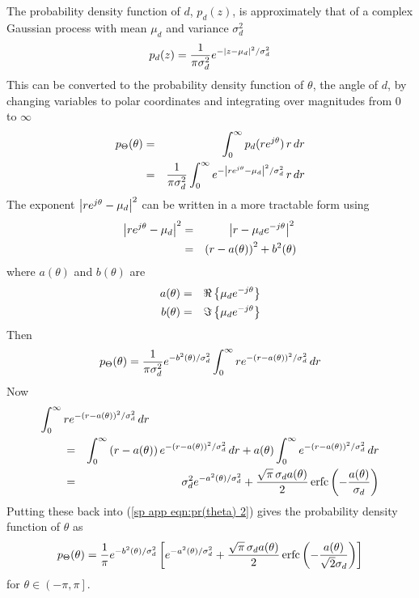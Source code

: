 The probability density function of $d$, $p_d(z)$, is approximately that of a
complex Gaussian process with mean $\mu_d$ and variance $\sigma_d^2$
\begin{equation}
p_d(z)=\frac{1}{\pi\sigma_d^2}
	{e^{-|z-\mu_d|^2/\sigma_d^2}}
\end{equation}
This can be converted to the probability density function of $\theta$, the
angle of $d$, by changing variables to polar coordinates and integrating
over magnitudes from $0$ to $\infty$
\begin{eqnarray}
p_{\Theta}(\theta)
&=&\int_0^{\infty} p_d(r{e^{j\theta}}) \,r\,dr {\nonumber} \\
&=&\frac{1}{\pi\sigma_d^2}\int_0^{\infty} 
  {e^{-\left|r{e^{j\theta}}-\mu_d\right|^2/\sigma_d^2}} \,r\,dr 
\end{eqnarray}
The exponent $\left|r{e^{j\theta}}-\mu_d\right|^2$ can be written in a more
tractable form using
\begin{eqnarray}
\left|r{e^{j\theta}}-\mu_d\right|^2&=&\left|r-\mu_d{e^{-j\theta}}\right|^2 {\nonumber}\\
&=&\left(r-a(\theta)\right)^2+b^2(\theta)
\end{eqnarray}
where $a(\theta)$ and $b(\theta)$ are
\begin{eqnarray}
a(\theta)&=&\Re\left\{\mu_d{e^{-j\theta}}\right\}\\
b(\theta)&=&\Im\left\{\mu_d{e^{-j\theta}}\right\}
\end{eqnarray}
Then
\begin{equation}\label{sp app eqn:pr(theta) 2}
p_{\Theta}(\theta)
=\frac{1}{\pi\sigma_d^2} {e^{-b^2(\theta)/\sigma_d^2}} 
\int_0^{\infty} r{e^{-\left(r-a(\theta)\right)^2/\sigma_d^2}}\,dr 
\end{equation}
Now 
\begin{eqnarray}
\lefteqn{\int_0^{\infty}r\e{-\left(r-a(\theta)\right)^2/\sigma_d^2}\,dr}
\qquad\nn\\
&=&\int_0^{\infty}\left(r-a(\theta)\right)
\e{-\left(r-a(\theta)\right)^2/\sigma_d^2}\,dr
+a(\theta)\int_0^{\infty}\e{-\left(r-a(\theta)\right)^2/\sigma_d^2}\,dr\nn\\
&=&\sigma_d^2\e{-a^2(\theta)/\sigma_d^2}+\frac{\sqrt{\pi}\,\sigma_d
a(\theta)}{2}\,\erfc{-\frac{a(\theta)}{\sigma_d}}
\end{eqnarray}
Putting these back into (\ref{sp app eqn:pr(theta) 2}) gives the probability
density function of $\theta$ as
\begin{equation}\label{sp app eqn:pr(theta) 3}
p_{\Theta}(\theta)
=\frac{1}{\pi} {e^{-b^2(\theta)/\sigma_d^2}} 
\left[{e^{-a^2(\theta)/\sigma_d^2}}+\frac{\sqrt{\pi}\,\sigma_d a(\theta)}{2}
\,{\mathop{\rm erfc}\nolimits\left(-\frac{a(\theta)}{\sqrt{2}\sigma_d}\right)}\right]
\end{equation}
for $\theta\in\left(-\pi,\pi\right]$.

